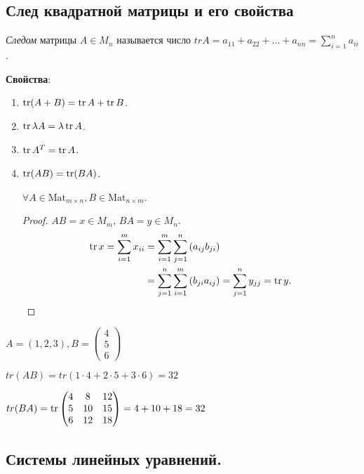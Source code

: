 \subsection{След квадратной матрицы и его свойства}
\begin{definition}
    \textit{Следом} матрицы $A \in M_n$ называется число $trA = a_{11} + a_{22} + \dots + a_{nn} = \sum_{i=1}^n a_{ii}$.
\end{definition}

\textbf{Свойства}:
\begin{enumerate}
\item $\operatorname{\mathop{\mathrm{tr}}}(A + B) = \operatorname{\mathop{\mathrm{tr}}} A + \operatorname{\mathop{\mathrm{tr}}} B$.
\item $\operatorname{\mathop{\mathrm{tr}}} \lambda A = \lambda \operatorname{\mathop{\mathrm{tr}}} A$.
\item $\operatorname{\mathop{\mathrm{tr}}} A^T = \operatorname{\mathop{\mathrm{tr}}} A$.
\item $\operatorname{\mathop{\mathrm{tr}}}(AB) = \operatorname{\mathop{\mathrm{tr}}}(BA)$.

    $\forall A \in \text{Mat}_{m \times n}, B \in \text{Mat}_{n \times m}$.
    \begin{proof}
        $AB = x \in M_m$, $BA = y \in M_n$.
        \begin{align*}
            \operatorname{\mathop{\mathrm{tr}}} x 
            = \sum_{i = 1}^{m} x_{ii} 
            &= \sum_{i = 1}^{m} \sum_{j = 1}^{n} \left(a_{ij} b_{ji}\right) \\
            &= \sum_{j = 1}^{n} \sum_{i = 1}^{m} \left(b_{ji} a_{ij}\right) 
            = \sum_{j = 1}^{n} y_{jj} 
            = \operatorname{\mathop{\mathrm{tr}}} y
        .\qedhere\end{align*}
    \end{proof}
\end{enumerate}

\begin{example}
    $A = (1, 2, 3), B = \begin{pmatrix}4 \\ 5 \\ 6\end{pmatrix}$

    $tr(AB) = tr(1 \cdot 4 + 2 \cdot 5 + 3 \cdot 6) = 32$

    $tr(BA) = \operatorname{\mathop{\mathrm{tr}}} \begin{pmatrix} 4 & 8 & 12 \\ 5 & 10 & 15 \\ 6 & 12 & 18 \end{pmatrix} = 4 + 10 + 18 = 32$
\end{example}


\subsection{Системы линейных уравнений.}

